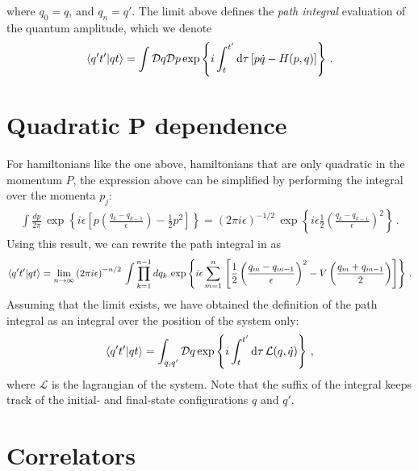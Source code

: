 \documentclass[notes]{subfiles}
\begin{document}
where $q_0 = q$, and $q_n = q'$. The limit above defines the {\em
  path integral} evaluation of the quantum amplitude, which we denote 
\begin{align}
  \label{eq:PathIntDefZero}
  \braket{q't'}{qt} = 
  \int \mathcal{D}q \mathcal{D}p \exp \left\{
  i \int_t^{t'} \dd{\tau} \left[
  p \dot{q} - H(p,q)
  \right]
  \right\}\, .
\end{align}

\section{Quadratic P dependence}
\label{sec:quadr-kinet-term}

For hamiltonians like the one above, \ie hamiltonians that are only
quadratic in the momentum $\hat{P}$, the expression above can be
simplified by performing the integral over the momenta $p_j$:
\begin{align}
  \int \frac{dp}{2\pi}\, \exp\left\{
  i\epsilon\left[
  p \left(\frac{q_k-q_{k-1}}{\epsilon}\right) - \frac12 p^2
  \right]
  \right\} = \left(2\pi i \epsilon\right)^{-1/2}\,
  \exp\left\{i\epsilon
  \frac12\left(\frac{q_k-q_{k-1}}{\epsilon}\right)^2\right\}\, .
\end{align}
Using this result, we can rewrite the path integral in
 as
\begin{align}
  \label{eq:PathIntDefOne}
  \braket{q't'}{qt} = \lim_{n\to\infty}
  \left(2\pi i \epsilon\right)^{-n/2}\,
  \int \prod_{k=1}^{n-1}dq_k\, 
  \exp \left\{
  i \epsilon \sum_{m=1}^{n}
  \, \left[
  \frac12 \left(\frac{q_m-q_{m-1}}{\epsilon}\right)^2
  -V\left(\frac{q_m+q_{m-1}}{2}\right)
  \right]
  \right\}\, .
\end{align}
Assuming that the limit exists, we have obtained the definition of the
path integral as an integral over the position of the system only: 
\begin{align}
  \label{eq:PathIntDef}
  \braket{q't'}{qt} = 
  \int_{q,q'} \mathcal{D}q \exp \left\{
  i \int_t^{t'} \dd{\tau}  \mathcal{L}(q,\dot{q})
  \right\}\, ,
\end{align}
where $\mathcal{L}$ is the lagrangian of the system. Note that the
suffix of the integral keeps track of the initial- and final-state
configurations $q$ and $q'$. 

\section{Correlators}
\label{sec:correlators}
\end{document}
